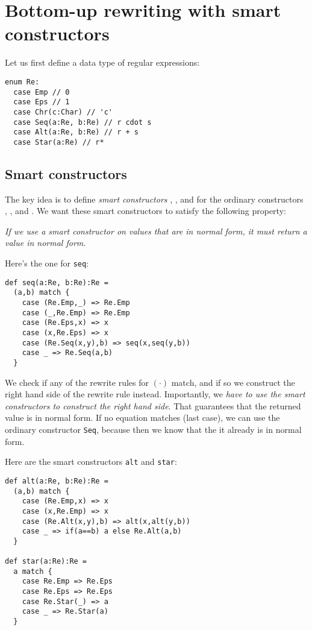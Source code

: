 \section{Bottom-up rewriting with smart constructors}

Let us first define a data type of regular expressions:

\begin{lstlisting}
enum Re:
  case Emp // 0
  case Eps // 1
  case Chr(c:Char) // 'c'
  case Seq(a:Re, b:Re) // r cdot s
  case Alt(a:Re, b:Re) // r + s
  case Star(a:Re) // r*
\end{lstlisting}

\subsection{Smart constructors}

The key idea is to define \emph{smart constructors} , , and  for the ordinary constructors , , and . We want these smart constructors to satisfy the following property:

\emph{If we use a smart constructor on values that are in normal form, it must return a value in normal form.}

Here's the one for \lstinline|seq|:

\begin{lstlisting}
def seq(a:Re, b:Re):Re =
  (a,b) match {
    case (Re.Emp,_) => Re.Emp
    case (_,Re.Emp) => Re.Emp
    case (Re.Eps,x) => x
    case (x,Re.Eps) => x
    case (Re.Seq(x,y),b) => seq(x,seq(y,b))
    case _ => Re.Seq(a,b)
  }
\end{lstlisting}

We check if any of the rewrite rules for $(\cdot)$ match, and if so we construct the right hand side of the rewrite rule instead. Importantly, we \emph{have to use the smart constructors to construct the right hand side}. That guarantees that the returned value is in normal form. If no equation matches (last case), we can use the ordinary constructor \lstinline|Seq|, because then we know that the it already is in normal form.

Here are the smart constructors \lstinline|alt| and \lstinline|star|:

\begin{lstlisting}
def alt(a:Re, b:Re):Re =
  (a,b) match {
    case (Re.Emp,x) => x
    case (x,Re.Emp) => x
    case (Re.Alt(x,y),b) => alt(x,alt(y,b))
    case _ => if(a==b) a else Re.Alt(a,b)
  }

def star(a:Re):Re =
  a match {
    case Re.Emp => Re.Eps
    case Re.Eps => Re.Eps
    case Re.Star(_) => a
    case _ => Re.Star(a)
  }
\end{lstlisting}

